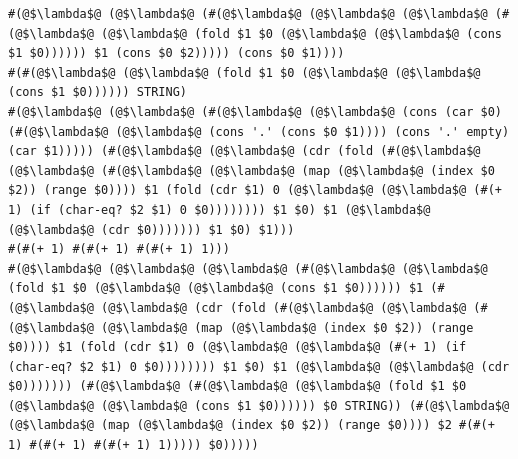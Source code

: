 \documentclass{article}
\begin{document}
\begin{lstlisting}
#(@$\lambda$@ (@$\lambda$@ (#(@$\lambda$@ (@$\lambda$@ (@$\lambda$@ (#(@$\lambda$@ (@$\lambda$@ (fold $1 $0 (@$\lambda$@ (@$\lambda$@ (cons $1 $0)))))) $1 (cons $0 $2))))) (cons $0 $1))))
#(#(@$\lambda$@ (@$\lambda$@ (fold $1 $0 (@$\lambda$@ (@$\lambda$@ (cons $1 $0)))))) STRING)
#(@$\lambda$@ (@$\lambda$@ (#(@$\lambda$@ (@$\lambda$@ (cons (car $0) (#(@$\lambda$@ (@$\lambda$@ (cons '.' (cons $0 $1)))) (cons '.' empty) (car $1))))) (#(@$\lambda$@ (@$\lambda$@ (cdr (fold (#(@$\lambda$@ (@$\lambda$@ (#(@$\lambda$@ (@$\lambda$@ (map (@$\lambda$@ (index $0 $2)) (range $0)))) $1 (fold (cdr $1) 0 (@$\lambda$@ (@$\lambda$@ (#(+ 1) (if (char-eq? $2 $1) 0 $0)))))))) $1 $0) $1 (@$\lambda$@ (@$\lambda$@ (cdr $0))))))) $1 $0) $1)))
#(#(+ 1) #(#(+ 1) #(#(+ 1) 1)))
#(@$\lambda$@ (@$\lambda$@ (@$\lambda$@ (#(@$\lambda$@ (@$\lambda$@ (fold $1 $0 (@$\lambda$@ (@$\lambda$@ (cons $1 $0)))))) $1 (#(@$\lambda$@ (@$\lambda$@ (cdr (fold (#(@$\lambda$@ (@$\lambda$@ (#(@$\lambda$@ (@$\lambda$@ (map (@$\lambda$@ (index $0 $2)) (range $0)))) $1 (fold (cdr $1) 0 (@$\lambda$@ (@$\lambda$@ (#(+ 1) (if (char-eq? $2 $1) 0 $0)))))))) $1 $0) $1 (@$\lambda$@ (@$\lambda$@ (cdr $0))))))) (#(@$\lambda$@ (#(@$\lambda$@ (@$\lambda$@ (fold $1 $0 (@$\lambda$@ (@$\lambda$@ (cons $1 $0)))))) $0 STRING)) (#(@$\lambda$@ (@$\lambda$@ (map (@$\lambda$@ (index $0 $2)) (range $0)))) $2 #(#(+ 1) #(#(+ 1) #(#(+ 1) 1))))) $0)))))
\end{lstlisting}
\end{document}
